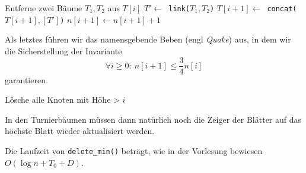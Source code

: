 \documentclass[a4paper,10pt]{article}
\begin{document}
\begin{description}
    \begin{algorithmic}
            \STATE Entferne zwei Bäume $T_1, T_2$ aus $T[i]$
            \STATE $T' \gets$\ \verb!link(!$T_1, T_2$\verb!)!
            \STATE $T[i+1] \gets$\ \verb!concat(!$T[i+1], [T']$\verb!)!
	 \STATE $n[i+1] \gets n[i+1]+1$
        \ENDWHILE
    \ENDFOR
    \end{algorithmic}
    Als letztes führen wir das namensgebende Beben (engl \emph{Quake}) aus, in dem wir die Sicherstellung der Invariante
    \[\forall i \geq 0{:}\ n[i+1] \leq \frac{3}{4} n[i]\]
    garantieren.
    \begin{algorithmic}
            \STATE Lösche alle Knoten mit Höhe > $i$
        \ENDIF
    \ENDFOR
    \end{algorithmic}
    In den Turnierbäumen müssen dann natürlich noch die Zeiger der Blätter auf das höchste Blatt wieder aktualisiert werden.
    
    Die Laufzeit von \verb!delete_min()! beträgt, wie in der Vorlesung bewiesen $O(\log n + T_0 + D)$.
\end{description}
\end{document}
